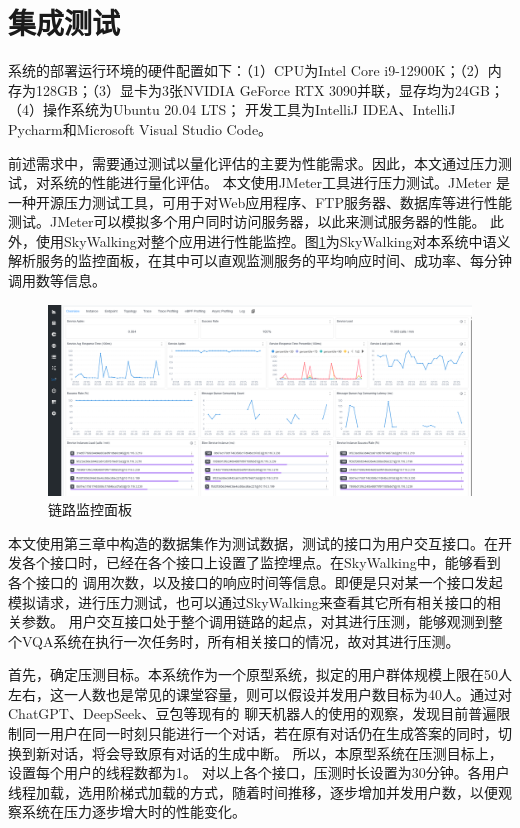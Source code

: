 \section{集成测试}
系统的部署运行环境的硬件配置如下：（1）CPU为Intel Core i9-12900K；（2）内存为128GB；（3）显卡为3张NVIDIA GeForce RTX 3090并联，显存均为24GB；（4）操作系统为Ubuntu 20.04 LTS；
开发工具为IntelliJ IDEA、IntelliJ Pycharm和Microsoft Visual Studio Code。

前述需求中，需要通过测试以量化评估的主要为性能需求。因此，本文通过压力测试，对系统的性能进行量化评估。
本文使用JMeter工具进行压力测试。JMeter 是一种开源压力测试工具，可用于对Web应用程序、FTP服务器、数据库等进行性能测试。JMeter可以模拟多个用户同时访问服务器，以此来测试服务器的性能。
此外，使用SkyWalking对整个应用进行性能监控。图\ref{fig:SkyWalking}为SkyWalking对本系统中语义解析服务的监控面板，在其中可以直观监测服务的平均响应时间、成功率、每分钟调用数等信息。
\begin{figure}[h]
    \centering
    \includegraphics[width=\textwidth]{figures/SkyWalking.png}
    \caption{链路监控面板}
    \label{fig:SkyWalking}
\end{figure}

本文使用第三章中构造的数据集作为测试数据，测试的接口为用户交互接口。在开发各个接口时，已经在各个接口上设置了监控埋点。在SkyWalking中，能够看到各个接口的
调用次数，以及接口的响应时间等信息。即便是只对某一个接口发起模拟请求，进行压力测试，也可以通过SkyWalking来查看其它所有相关接口的相关参数。
用户交互接口处于整个调用链路的起点，对其进行压测，能够观测到整个VQA系统在执行一次任务时，所有相关接口的情况，故对其进行压测。

首先，确定压测目标。本系统作为一个原型系统，拟定的用户群体规模上限在50人左右，这一人数也是常见的课堂容量，则可以假设并发用户数目标为40人。通过对ChatGPT、DeepSeek、豆包等现有的
聊天机器人的使用的观察，发现目前普遍限制同一用户在同一时刻只能进行一个对话，若在原有对话仍在生成答案的同时，切换到新对话，将会导致原有对话的生成中断。
所以，本原型系统在压测目标上，设置每个用户的线程数都为1。
对以上各个接口，压测时长设置为30分钟。各用户线程加载，选用阶梯式加载的方式，随着时间推移，逐步增加并发用户数，以便观察系统在压力逐步增大时的性能变化。

